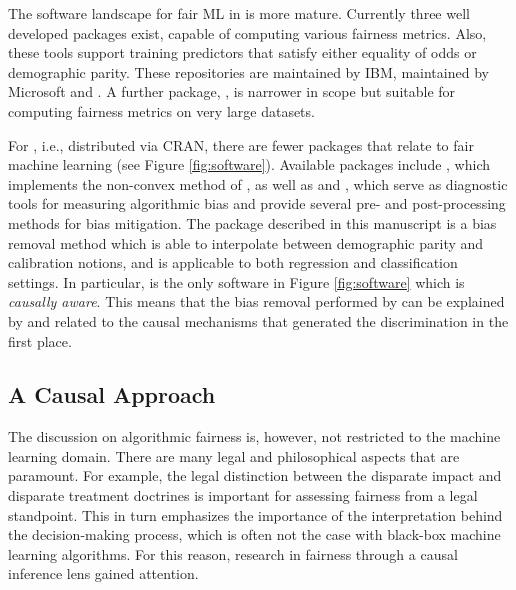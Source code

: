 \documentclass[
  nojss]{jss}
\begin{document}
The software landscape for fair ML in  is more mature.
Currently three well developed packages exist, capable of computing
various fairness metrics. Also, these tools support training predictors
that satisfy either equality of odds or demographic parity. These
repositories are  \citep{aif360-oct-2018} maintained by IBM,
 \citep{bird2020fairlearn} maintained by Microsoft and
 \citep{ethicMLrepo}. A further package,
 \citep{fairnessind}, is narrower in scope but
suitable for computing fairness metrics on very large datasets.

For , i.e., distributed via CRAN, there are fewer packages
that relate to fair machine learning (see Figure \ref{fig:software}).
Available packages include  \citep{scutari2021fairml}, which
implements the non-convex method of \cite{komiyama2018nonconvex}, as
well as  \citep{kozodoi2021fairness} and 
\citep{wisniewski2021fairmodels}, which serve as diagnostic tools for
measuring algorithmic bias and provide several pre- and post-processing
methods for bias mitigation. The  package described in
this manuscript is a bias removal method which is able to interpolate
between demographic parity and calibration notions, and is applicable to
both regression and classification settings. In particular,
 is the only software in Figure \ref{fig:software} which
is \emph{causally aware}. This means that the bias removal performed by
 can be explained by and related to the causal mechanisms
that generated the discrimination in the first place.

\hypertarget{a-causal-approach}{%
\subsection{A Causal Approach}\label{a-causal-approach}}

The discussion on algorithmic fairness is, however, not restricted to
the machine learning domain. There are many legal and philosophical
aspects that are paramount. For example, the legal distinction between
the disparate impact and disparate treatment doctrines
\citep{mcginley2011ricci, barocas2016big} is important for assessing
fairness from a legal standpoint. This in turn emphasizes the importance
of the interpretation behind the decision-making process, which is often
not the case with black-box machine learning algorithms. For this
reason, research in fairness through a causal inference lens gained
attention.
\end{document}
